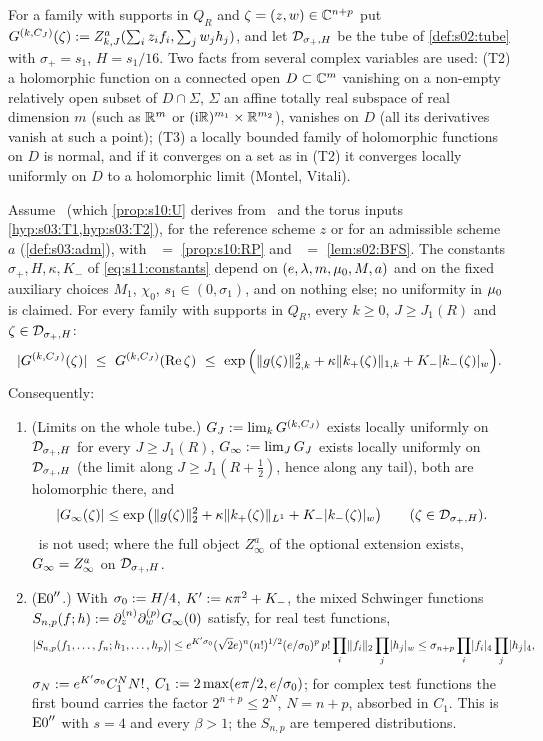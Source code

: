 For a family with supports in $Q_R$ and $\zeta=(z,w)\in\mathbb C^{n+p}$ put $G^{(k,C_J)}(\zeta):= Z^a_{k,J}(\sum_iz_if_i,\sum_jw_jh_j)$, and let $\mathcal D_{\sigma_+,H}$ be the tube of \cref{def:s02:tube} with $\sigma_+=s_1$, $H=s_1/16$. Two facts from several complex variables \cite{Hor90} are used: (T2) a holomorphic function on a connected open $D\subset\mathbb C^m$ vanishing on a non-empty relatively open subset of $D\cap\Sigma$, $\Sigma$ an affine totally real subspace of real dimension $m$ (such as $\mathbb R^m$ or $(\mathrm i\mathbb R)^{m_1}\times\mathbb R^{m_2}$), vanishes on $D$ (all its derivatives vanish at such a point); (T3) a locally bounded family of holomorphic functions on $D$ is normal, and if it converges on a set as in (T2) it converges locally uniformly on $D$ to a holomorphic limit (Montel, Vitali).

\begin{theorem}\label{thm:s11:W}
Assume \Itwo\ (which \cref{prop:s10:U} derives from \Tthree\ and the torus inputs \cref{hyp:s03:T1,hyp:s03:T2}), for the reference scheme $z$ or for an admissible scheme $a$ (\cref{def:s03:adm}), with \Ithree\ $=$ \cref{prop:s10:RP} and \Ifour\ $=$ \cref{lem:s02:BFS}. The constants $\sigma_+,H,\kappa,K_-$ of \eqref{eq:s11:constants} depend on $(e,\lambda,m,\mu_0,M,a)$ and on the fixed auxiliary choices $M_1$, $\chi_0$, $s_1\in(0,\sigma_1)$, and on nothing else; no uniformity in $\mu_0$ is claimed. For every family with supports in $Q_R$, every $k\ge0$, $J\ge J_1(R)$ and $\zeta\in\mathcal D_{\sigma_+,H}$:
\begin{equation}\label{eq:s11:W}
|G^{(k,\CJ)}(\zeta)|\ \le\ G^{(k,\CJ)}(\Re\zeta)\ \le\ \exp\Big(\norm{g(\zeta)}_{2,k}^2+\kappa\norm{k_+(\zeta)}_{1,k}+K_-\wnorm{k_-(\zeta)}\Big).
\end{equation}
Consequently:
\begin{enumerate}[label=\textup{(\roman*)},leftmargin=*]
\item \textup{(Limits on the whole tube.)} $G_J:=\lim_kG^{(k,C_J)}$ exists locally uniformly on $\mathcal D_{\sigma_+,H}$ for every $J\ge J_1(R)$, $G_\infty:=\lim_JG_J$ exists locally uniformly on $\mathcal D_{\sigma_+,H}$ (the limit along $J\ge J_1(R+\frac12)$, hence along any tail), both are holomorphic there, and
\[
|G_\infty(\zeta)|\le\exp\big(\lVert g(\zeta)\rVert_2^2+\kappa\lVert k_+(\zeta)\rVert_{L^1}+K_-\lvert k_-(\zeta)\rvert_{w}\big)\qquad(\zeta\in\mathcal D_{\sigma_+,H}).
\]
\Wtwo\ is not used; where the full object $Z^a_\infty$ of the optional extension exists, $G_\infty=Z^a_\infty$ on $\mathcal D_{\sigma_+,H}$.
\item \textup{($\mathrm{E0}''$.)} With $\sigma_0:= H/4$, $K':=\kappa\pi^2+K_-$, the mixed Schwinger functions $S_{n,p}(f;h):=\partial^{(n)}_z\partial^{(p)}_wG_\infty(0)$ satisfy, for real test functions,
\[
|S_{n,p}(f_1,\dots,f_n;h_1,\dots,h_p)|\le e^{K'\sigma_0}(\sqrt2e)^n(n!)^{1/2}(e/\sigma_0)^p\,p!\prod_i\lVert f_i\rVert_2\prod_j\lvert h_j\rvert_{w}\le\sigma_{n+p}\prod_i\lvert f_i\rvert_{4}\prod_j\lvert h_j\rvert_{4},
\]
$\sigma_N:= e^{K'\sigma_0}C_1^NN!$, $C_1:=2\max(e\pi/2,e/\sigma_0)$; for complex test functions the first bound carries the factor $2^{n+p}\le2^N$, $N=n+p$, absorbed in $C_1$. This is $\mathrm{E0}''$ with $s=4$ and every $\beta>1$; the $S_{n,p}$ are tempered distributions.
\end{enumerate}
\end{theorem}

